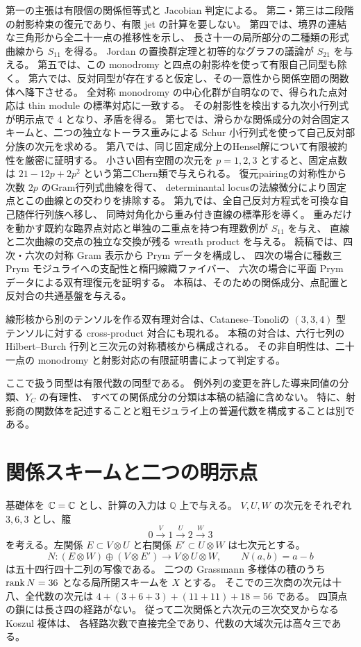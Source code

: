 第一の主張は有限個の関係恒等式と Jacobian 判定による。
第二・第三は二段階の射影枠束の復元であり、有限 jet の計算を要しない。
第四では、境界の連結な三角形から全二十一点の推移性を示し、
長さ十一の局所部分の二種類の形式曲線から $S_{11}$ を得る。
Jordan の置換群定理\cite{Jones}と初等的なグラフの議論が $S_{21}$ を与える。
第五では、この monodromy と四点の射影枠を使って有限自己同型も除く。
第六では、反対同型が存在すると仮定し、その一意性から関係空間の関数体へ降下させる。
全対称 monodromy の中心化群が自明なので、得られた点対応は thin module の標準対応に一致する。
その射影性を検出する九次小行列式が明示点で $4$ となり、矛盾を得る。
第七では、滑らかな関係成分の対合固定スキームと、二つの独立なトーラス重みによる
Schur 小行列式を使って自己反対部分族の次元を求める。
第八では、同じ固定成分上のHensel解について有限被約性を厳密に証明する。
小さい固有空間の次元を $p=1,2,3$ とすると、固定点数は
$21-12p+2p^2$ という第二Chern類で与えられる。
復元pairingの対称性から次数 $2p$ のGram行列式曲線を得て、
determinantal locusの法線微分により固定点とこの曲線との交わりを排除する。
第九では、全自己反対方程式を可換な自己随伴行列族へ移し、
同時対角化から重み付き直線の標準形を導く。
重みだけを動かす既約な臨界点対応と単独の二重点を持つ有理数例が $S_{11}$ を与え、
直線と二次曲線の交点の独立な交換が残る wreath product を与える。
続稿\cite{PaperV}では、四次・六次の対称 Gram 表示から Prym データを構成し、
四次の場合に種数三 Prym モジュライへの支配性と楕円線織ファイバー、
六次の場合に平面 Prym データによる双有理復元を証明する。
本稿は、そのための関係成分、点配置と反対合の共通基盤を与える。

線形核から別のテンソルを作る双有理対合は、Catanese--Tonoli\cite{CT}の
$(3,3,4)$ 型テンソルに対する cross-product 対合にも現れる。
本稿の対合は、六行七列の Hilbert--Burch 行列と三次元の対称積核から構成される。
その非自明性は、二十一点の monodromy と射影対応の有限証明書によって判定する。

ここで扱う同型は有限代数の同型である。
例外列の変更を許した導来同値の分類、$Y_C$ の有理性、
すべての関係成分の分類は本稿の結論に含めない。
特に、射影商の関数体を記述することと粗モジュライ上の普遍代数を構成することは別である。

\section{関係スキームと二つの明示点}
\label{sec:relation}
基礎体を $\mathbb C=\mathbb C$ とし、計算の入力は $\mathbb Q$ 上で与える。
$V,U,W$ の次元をそれぞれ $3,6,3$ とし、箙
\[
 0\xrightarrow{V}1\xrightarrow{U}2\xrightarrow{W}3
\]
を考える。左関係 $E\subset V\otimes U$ と右関係 $E'\subset U\otimes W$ は七次元とする。
\[
 N:(E\otimes W)\oplus(V\otimes E')\longrightarrow V\otimes U\otimes W,
 \qquad N(a,b)=a-b
\]
は五十四行四十二列の写像である。
二つの Grassmann 多様体の積のうち $\operatorname{rank} N=36$ となる局所閉スキームを $X$ とする。
そこでの三次商の次元は十八、全代数の次元は
$4+(3+6+3)+(11+11)+18=56$ である。
四頂点の鎖には長さ四の経路がない。
従って二次関係と六次元の三次交叉からなる Koszul 複体は、
各経路次数で直接完全であり、代数の大域次元は高々三である。


